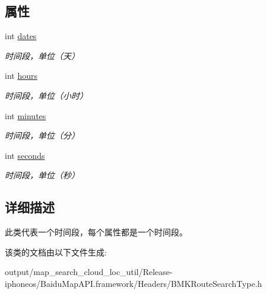 \subsection*{属性}
\begin{DoxyCompactItemize}
\item 
\hypertarget{interface_b_m_k_time_a24bb65125c9fd504229a04e616130cb1}{}int \hyperlink{interface_b_m_k_time_a24bb65125c9fd504229a04e616130cb1}{dates}\label{interface_b_m_k_time_a24bb65125c9fd504229a04e616130cb1}

\begin{DoxyCompactList}\small\item\em 时间段，单位（天） \end{DoxyCompactList}\item 
\hypertarget{interface_b_m_k_time_ae91ad4ffdcb6c8c42a5477199e4947f8}{}int \hyperlink{interface_b_m_k_time_ae91ad4ffdcb6c8c42a5477199e4947f8}{hours}\label{interface_b_m_k_time_ae91ad4ffdcb6c8c42a5477199e4947f8}

\begin{DoxyCompactList}\small\item\em 时间段，单位（小时） \end{DoxyCompactList}\item 
\hypertarget{interface_b_m_k_time_a8c39c525065b0fef0983a0feddae471d}{}int \hyperlink{interface_b_m_k_time_a8c39c525065b0fef0983a0feddae471d}{minutes}\label{interface_b_m_k_time_a8c39c525065b0fef0983a0feddae471d}

\begin{DoxyCompactList}\small\item\em 时间段，单位（分） \end{DoxyCompactList}\item 
\hypertarget{interface_b_m_k_time_a66d0a1c9418ef56ef10ad023513c0f95}{}int \hyperlink{interface_b_m_k_time_a66d0a1c9418ef56ef10ad023513c0f95}{seconds}\label{interface_b_m_k_time_a66d0a1c9418ef56ef10ad023513c0f95}

\begin{DoxyCompactList}\small\item\em 时间段，单位（秒） \end{DoxyCompactList}\end{DoxyCompactItemize}


\subsection{详细描述}
此类代表一个时间段，每个属性都是一个时间段。 

该类的文档由以下文件生成\+:\begin{DoxyCompactItemize}
\item 
output/map\+\_\+search\+\_\+cloud\+\_\+loc\+\_\+util/\+Release-\/iphoneos/\+Baidu\+Map\+A\+P\+I.\+framework/\+Headers/B\+M\+K\+Route\+Search\+Type.\+h\end{DoxyCompactItemize}
